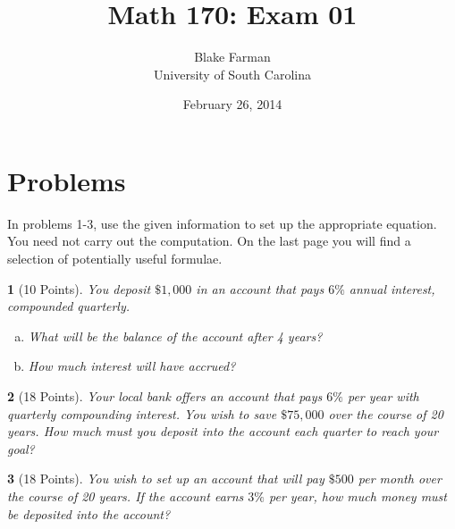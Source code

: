 \documentclass[12pt]{amsart}
\author{Blake Farman\\University of South Carolina}
\title{Math 170: Exam 01}
\date{February 26, 2014}
\begin{document}
\maketitle

\begin{center}
\end{center}

\vspace{0.2in}
\vspace{0.2in}

\theoremstyle{plain}
\newtheorem{thm}{}
\newtheorem{lem}{Lemma}
\theoremstyle{definition}
\newtheorem{defn}{Definition}

\section{Problems}

\noindent In problems 1-3, use the given information to set up the appropriate equation.
You need not carry out the computation.
On the last page you will find a selection of potentially useful formulae.
\begin{thm}[10 Points]\label{ex1}
  You deposit $\$1,000$ in an account that pays $6\%$ annual interest, compounded quarterly.
  \begin{enumerate}[(a)]
  \item
    What will be the balance of the account after 4 years?
    \vspace{1.5in}
  \item
    How much interest will have accrued?
  \end{enumerate}
\end{thm}

\newpage
\begin{thm}[18 Points]\label{ex2}
  Your local bank offers an account that pays $6\%$ per year with quarterly compounding interest.
  You wish to save $\$75,000$ over the course of 20 years.
  How much must you deposit into the account each quarter to reach your goal?
  \vspace{4in}
\end{thm}

\begin{thm}[18 Points]\label{ex3}
  You wish to set up an account that will pay $\$500$ per month over the course of 20 years.
  If the account earns $3\%$ per year, how much money must be deposited into the account?
\end{thm}
\end{document}

